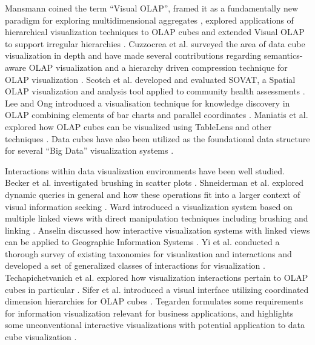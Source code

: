 Mansmann coined the term ``Visual OLAP'', framed it as a fundamentally new paradigm for exploring multidimensional aggregates \cite{mansmann2008visual}, explored applications of hierarchical visualization techniques to OLAP cubes \cite{mansmann2007exploring} and extended Visual OLAP to support irregular hierarchies \cite{mansmann2006extending}. Cuzzocrea et al. surveyed the area of data cube visualization in depth \cite{cuzzocrea2009olap} and have made several contributions regarding semantics-aware OLAP visualization \cite{cuzzocrea2007semantics} and a hierarchy driven compression technique for OLAP visualization \cite{cuzzocrea2006hierarchy}. Scotch et al. developed and evaluated SOVAT, a Spatial OLAP visualization and analysis tool applied to community health assessments \cite{scotch2005sovat, scotch2007usability}. Lee and Ong introduced a visualisation technique for knowledge discovery in OLAP combining elements of bar charts and parallel coordinates \cite{lee1995new}. Maniatis et al. explored how OLAP cubes can be visualized using TableLens and other techniques \cite{maniatis2003advanced}. Data cubes have also been utilized as the foundational data structure for several ``Big Data'' visualization systems \cite{lins2013nanocubes, liu2013immens}.

Interactions within data visualization environments have been well studied. Becker et al. investigated brushing in scatter plots \cite{becker1987brushing}. Shneiderman et al. explored dynamic queries in general and how these operations fit into a larger context of visual information seeking \cite{shneiderman1994dynamic}. Ward introduced a visualization system based on multiple linked views with direct manipulation techniques including brushing and linking \cite{ward1994xmdvtool}. Anselin discussed how interactive visualization systems with linked views can be applied to Geographic Information Systems \cite{anselin1999interactive}. Yi et al. conducted a thorough survey of existing taxonomies for visualization and interactions and developed a set of generalized classes of interactions for visualization \cite{yi2007toward}. Techapichetvanich et al. explored how visualization interactions pertain to OLAP cubes in particular \cite{techapichetvanich2005interactive}. Sifer et al. introduced a visual interface utilizing coordinated dimension hierarchies for OLAP cubes \cite{sifer2003visual}. Tegarden formulates some requirements for information visualization relevant for business applications, and highlights some unconventional interactive visualizations with potential application to data cube visualization \cite{tegarden1999business}.

